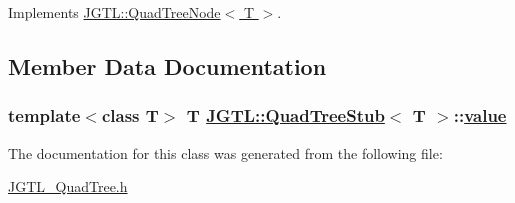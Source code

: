 Implements \hyperlink{class_j_g_t_l_1_1_quad_tree_node_5d3e714f007be6a1ab507bcda173aede}{JGTL::Quad\-Tree\-Node$<$ T $>$}.

\subsection{Member Data Documentation}
\hypertarget{class_j_g_t_l_1_1_quad_tree_stub_2b4f08acca095e6e2f3f92afc9f0449e}{
\subsubsection[value]{\setlength{\rightskip}{0pt plus 5cm}template$<$class T$>$ T \hyperlink{class_j_g_t_l_1_1_quad_tree_stub}{JGTL::Quad\-Tree\-Stub}$<$ T $>$::\hyperlink{class_j_g_t_l_1_1_quad_tree_stub_2b4f08acca095e6e2f3f92afc9f0449e}{value}}}
\label{class_j_g_t_l_1_1_quad_tree_stub_2b4f08acca095e6e2f3f92afc9f0449e}




The documentation for this class was generated from the following file:\begin{CompactItemize}
\item 
\hyperlink{_j_g_t_l___quad_tree_8h}{JGTL\_\-Quad\-Tree.h}\end{CompactItemize}
